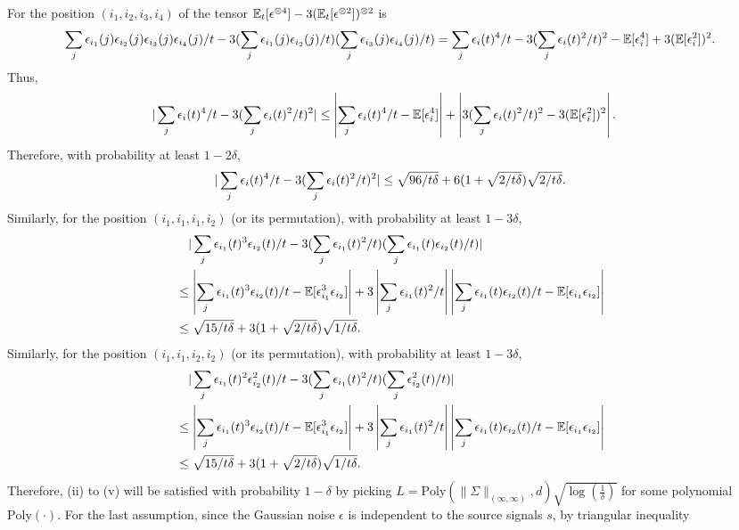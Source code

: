 For the position $(i_1,i_2,i_3,i_4)$ of the tensor $\mathbb{E}_t[\epsilon^{\otimes4}] - 3(\mathbb{E}_t[\epsilon^{\otimes2}])^{\otimes 2}$ is
\[
\sum_j \epsilon_{i_1}(j)\epsilon_{i_2}(j)\epsilon_{i_3}(j)\epsilon_{i_4}(j)/t - 3(\sum_j \epsilon_{i_1}(j)\epsilon_{i_2}(j)/t)(\sum_j \epsilon_{i_3}(j)\epsilon_{i_4}(j)/t) = \sum_j \epsilon_i(t)^4/t - 3(\sum_j \epsilon_i(t)^2/t)^2  - \mathbb{E}[\epsilon_i^4] + 3(\mathbb{E}[\epsilon_i^2])^2.
\]  
Thus, 
\begin{align*}
|\sum_j \epsilon_i(t)^4/t - 3(\sum_j \epsilon_i(t)^2/t)^2| & \le \left|\sum_j \epsilon_i(t)^4/t - \mathbb{E}[\epsilon_i^4]\right| + \left|3(\sum_j \epsilon_i(t)^2/t)^2 - 3(\mathbb{E}[\epsilon_i^2])^2\right|. 
\end{align*}
Therefore, with probability at least $1-2\delta$, 
\[
|\sum_j \epsilon_i(t)^4/t - 3(\sum_j \epsilon_i(t)^2/t)^2| \le \sqrt{96/t\delta}+ 6(1+\sqrt{2/t\delta})\sqrt{2/t\delta}.
\]
Similarly, for the position $(i_1,i_1,i_1,i_2)$ (or its permutation), with probability at least $1-3\delta$,
\begin{align*}
&\quad |\sum_j \epsilon_{i_1}(t)^3\epsilon_{i_2}(t)/t - 3(\sum_j \epsilon_{i_1}(t)^2/t)(\sum_j \epsilon_{i_1}(t)\epsilon_{i_2}(t)/t)| \\
& \le \left|\sum_j \epsilon_{i_1}(t)^3\epsilon_{i_2}(t)/t -  \mathbb{E}[\epsilon_{i_1}^3 \epsilon_{i_2}]\right| +3\left|\sum_j \epsilon_{i_1}(t)^2/t\right|\left|\sum_j \epsilon_{i_1}(t)\epsilon_{i_2}(t)/t - \mathbb{E}[\epsilon_{i_1}\epsilon_{i_2}]\right| \\
& \le \sqrt{15/t\delta}+ 3(1+\sqrt{2/t\delta})\sqrt{1/t\delta}.
\end{align*}
Similarly, for the position $(i_1,i_1,i_2,i_2)$ (or its permutation), with probability at least $1-3\delta$,
\begin{align*}
&\quad |\sum_j \epsilon_{i_1}(t)^2\epsilon_{i_2}^2(t)/t - 3(\sum_j \epsilon_{i_1}(t)^2/t)(\sum_j \epsilon_{i_2}^2(t)/t)| \\
& \le \left|\sum_j \epsilon_{i_1}(t)^3\epsilon_{i_2}(t)/t -  \mathbb{E}[\epsilon_{i_1}^3 \epsilon_{i_2}]\right| +3\left|\sum_j \epsilon_{i_1}(t)^2/t\right|\left|\sum_j \epsilon_{i_1}(t)\epsilon_{i_2}(t)/t - \mathbb{E}[\epsilon_{i_1}\epsilon_{i_2}]\right| \\
& \le \sqrt{15/t\delta}+ 3(1+\sqrt{2/t\delta})\sqrt{1/t\delta}.
\end{align*}
Therefore, (ii) to (v) will be satisfied with probability $1-\delta$ by picking $L = \text{Poly}(\|\Sigma\|_{(\infty,\infty)}, d)\sqrt{\log(\frac{1}{\delta})}$ for some polynomial $\text{Poly}(\cdot)$.
\fi
For the last assumption, since the Gaussian noise $\epsilon$ is independent to the source signals $s$, by triangular inequality 
